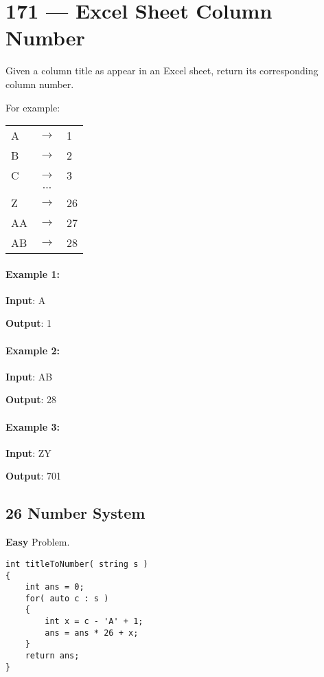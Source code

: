 \section{171 --- Excel Sheet Column Number}
Given a column title as appear in an Excel sheet, return its corresponding column number.

For example:
\begin{table}[H]
\begin{tabular}{lcl}
A & $\to$ & 1 \\
B & $\to$ & 2 \\
C & $\to$ & 3 \\
 & $\cdots$ & \\
Z & $\to$ & 26  \\
AA & $\to$ &27  \\
AB & $\to$ &28  
\end{tabular}
\end{table}
\paragraph{Example 1:}
\begin{flushleft}
\textbf{Input}: A

\textbf{Output}: 1
\end{flushleft}
\paragraph{Example 2:}
\begin{flushleft}
\textbf{Input}: AB

\textbf{Output}: 28
\end{flushleft}
\paragraph{Example 3:}
\begin{flushleft}
\textbf{Input}: ZY

\textbf{Output}: 701
\end{flushleft}

\subsection{26 Number System}
\textbf{Easy} Problem.
\begin{lstlisting}[style=customc, caption={26 Number System}]
int titleToNumber( string s )
{
    int ans = 0;
    for( auto c : s )
    {
        int x = c - 'A' + 1;
        ans = ans * 26 + x;
    }
    return ans;
}
\end{lstlisting}